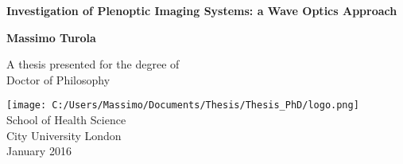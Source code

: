 \begin{titlepage}
    \begin{center}
        \vspace*{1cm}
        \LARGE
        \textbf{Investigation of Plenoptic Imaging Systems: a Wave Optics Approach}
        
        \large
        \vspace{1cm}
        \Large
        \textbf{Massimo Turola}
       
        \vfill
        \large
        A thesis presented for the degree of\\
        Doctor of Philosophy
        
        \vspace{0.8cm}
        
        \texttt{[image: C:/Users/Massimo/Documents/Thesis/Thesis\_PhD/logo.png]}
        \\
        \large
        School of Health Science\\
        City University London\\
        January 2016
        
    \end{center}
\end{titlepage}